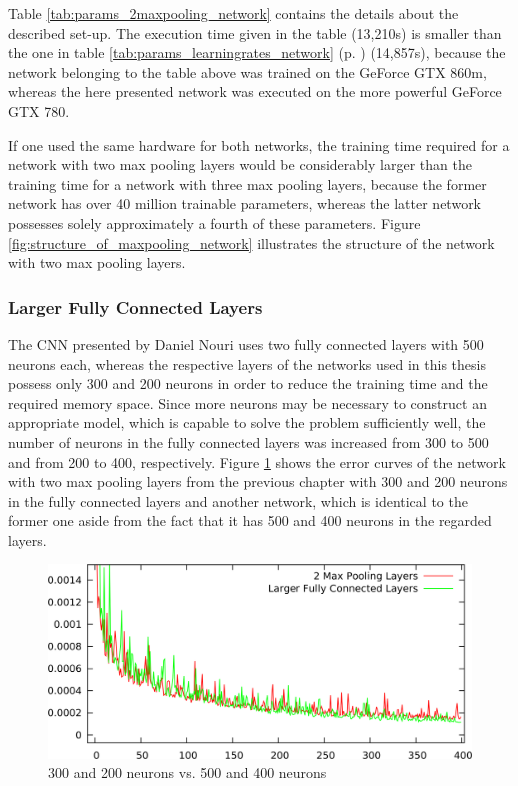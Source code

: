 \documentclass[11pt, a4paper]{article}
\newcommand\myref[1]{\ref{#1} (p. \pageref{#1})}
\begin{document}
Table \ref{tab:params_2maxpooling_network} contains the details about the described set-up. The execution time given in the table (13,210s) is smaller than the one in table \myref{tab:params_learningrates_network} (14,857s), because the network belonging to the table above was trained on the GeForce GTX 860m, whereas the here presented network was executed on the more powerful GeForce GTX 780.



If one used the same hardware for both networks, the training time required for a network with two max pooling layers would be considerably larger than the training time for a network with three max pooling layers, because the former network has over 40 million trainable parameters, whereas the latter network possesses solely approximately a fourth of these parameters. Figure \ref{fig:structure_of_maxpooling_network} illustrates the structure of the network with two max pooling layers.



\subsubsection{Larger Fully Connected Layers}
\label{subsubsec:largerfc}

The \ac{CNN} presented by Daniel Nouri uses two fully connected layers with 500 neurons each, whereas the respective layers of the networks used in this thesis possess only 300 and 200 neurons in order to reduce the training time and the required memory space. Since more neurons may be necessary to construct an appropriate model, which is capable to solve the problem sufficiently well, the number of neurons in the fully connected layers was increased from 300 to 500 and from 200 to 400, respectively. Figure \ref{fig:cnn_largerfc} shows the error curves of the network with two max pooling layers from the previous chapter with 300 and 200 neurons in the fully connected layers and another network, which is identical to the former one aside from the fact that it has 500 and 400 neurons in the regarded layers.

\begin{figure}[h!]
	\centering
	\includegraphics[width=\textwidth]{results/cnn_largerfc.png}
	\caption{300 and 200 neurons vs. 500 and 400 neurons}
	\label{fig:cnn_largerfc}
\end{figure}
\end{document}
